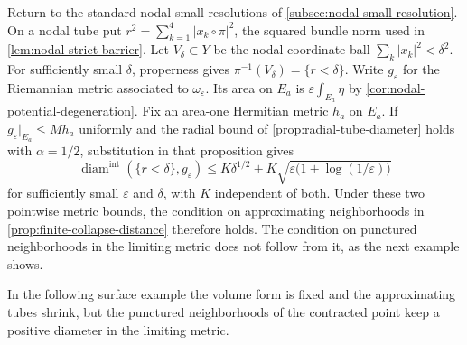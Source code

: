 Return to the standard nodal small resolutions of \cref{subsec:nodal-small-resolution}. On a nodal tube put $r^2=\sum_{k=1}^4|x_k\circ\pi|^2$, the squared bundle norm used in \cref{lem:nodal-strict-barrier}. Let $V_\delta\subset Y$ be the nodal coordinate ball $\sum_k|x_k|^2<\delta^2$. For sufficiently small $\delta$, properness gives $\pi^{-1}(V_\delta)=\{r<\delta\}$. Write $g_\varepsilon$ for the Riemannian metric associated to $\omega_\varepsilon$. Its area on $E_a$ is $\varepsilon\int_{E_a}\eta$ by \cref{cor:nodal-potential-degeneration}. Fix an area-one Hermitian metric $h_a$ on $E_a$. If $g_\varepsilon|_{E_a}\leq M h_a$ uniformly and the radial bound of \cref{prop:radial-tube-diameter} holds with $\alpha=1/2$, substitution in that proposition gives
\[
 \operatorname{diam}^{\mathrm{int}}(\{r<\delta\},g_\varepsilon)
       \leq K\delta^{1/2}
                 +K\sqrt{\varepsilon\bigl(1+\log(1/\varepsilon)\bigr)}
\]
for sufficiently small $\varepsilon$ and $\delta$, with $K$ independent of both. Under these two pointwise metric bounds, the condition on approximating neighborhoods in \cref{prop:finite-collapse-distance} therefore holds. The condition on punctured neighborhoods in the limiting metric does not follow from it, as the next example shows.

In the following surface example the volume form is fixed and the approximating tubes shrink, but the punctured neighborhoods of the contracted point keep a positive diameter in the limiting metric.

